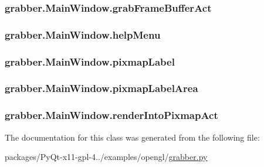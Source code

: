 \subsubsection[{grab\+Frame\+Buffer\+Act}]{\setlength{\rightskip}{0pt plus 5cm}grabber.\+Main\+Window.\+grab\+Frame\+Buffer\+Act}\label{classgrabber_1_1MainWindow_a63941fabe79337482b6de26cf70363e5}
\hypertarget{classgrabber_1_1MainWindow_a8e2de8425717fc0bf828a28a78e12376}{}
\subsubsection[{help\+Menu}]{\setlength{\rightskip}{0pt plus 5cm}grabber.\+Main\+Window.\+help\+Menu}\label{classgrabber_1_1MainWindow_a8e2de8425717fc0bf828a28a78e12376}
\hypertarget{classgrabber_1_1MainWindow_a7443d949c304a43598274d5649b745a7}{}
\subsubsection[{pixmap\+Label}]{\setlength{\rightskip}{0pt plus 5cm}grabber.\+Main\+Window.\+pixmap\+Label}\label{classgrabber_1_1MainWindow_a7443d949c304a43598274d5649b745a7}
\hypertarget{classgrabber_1_1MainWindow_a544c3e4a025f3af38b7d348ead6a1c90}{}
\subsubsection[{pixmap\+Label\+Area}]{\setlength{\rightskip}{0pt plus 5cm}grabber.\+Main\+Window.\+pixmap\+Label\+Area}\label{classgrabber_1_1MainWindow_a544c3e4a025f3af38b7d348ead6a1c90}
\hypertarget{classgrabber_1_1MainWindow_a8b958b8902ac70bbcf16fcfe8a619791}{}
\subsubsection[{render\+Into\+Pixmap\+Act}]{\setlength{\rightskip}{0pt plus 5cm}grabber.\+Main\+Window.\+render\+Into\+Pixmap\+Act}\label{classgrabber_1_1MainWindow_a8b958b8902ac70bbcf16fcfe8a619791}


The documentation for this class was generated from the following file\+:\begin{DoxyCompactItemize}
\item 
packages/\+Py\+Qt-\/x11-\/gpl-\/4../examples/opengl/\hyperlink{grabber_8py}{grabber.\+py}\end{DoxyCompactItemize}
